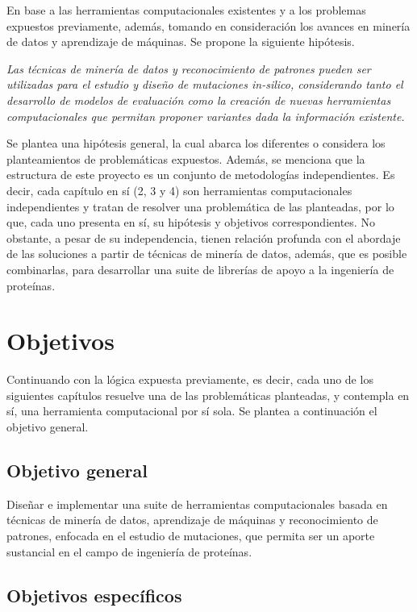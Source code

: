 En base a las herramientas computacionales existentes y a los problemas expuestos previamente, además, tomando en consideración los avances en minería de datos y aprendizaje de máquinas. Se propone la siguiente hipótesis.

\begin{center}
	\textit{Las técnicas de minería de datos y reconocimiento de patrones pueden ser utilizadas para el estudio y diseño de mutaciones in-silico, considerando tanto el desarrollo de modelos de evaluación como la creación de nuevas herramientas computacionales que permitan proponer variantes dada la información existente.}
\end{center}

Se plantea una hipótesis general, la cual abarca los diferentes o considera los planteamientos de problemáticas expuestos. Además, se menciona que la estructura de este proyecto es un conjunto de metodologías independientes. Es decir, cada capítulo en sí (2, 3 y 4) son herramientas computacionales independientes y tratan de resolver una problemática de las planteadas, por lo que, cada uno presenta en sí, su hipótesis y objetivos correspondientes. No obstante, a pesar de su independencia, tienen relación profunda con el abordaje de las soluciones a partir de técnicas de minería de datos, además, que es posible combinarlas, para desarrollar una suite de librerías de apoyo a la ingeniería de proteínas.

\section{Objetivos}

Continuando con la lógica expuesta previamente, es decir, cada uno de los siguientes capítulos resuelve una de las problemáticas planteadas, y contempla en sí, una herramienta computacional por sí sola. Se plantea a continuación el objetivo general.

\subsection{Objetivo general}

Diseñar e implementar una suite de herramientas computacionales basada en técnicas de minería de datos, aprendizaje de máquinas y reconocimiento de patrones, enfocada en el estudio de mutaciones, que permita ser un aporte sustancial en el campo de ingeniería de proteínas.

\subsection{Objetivos específicos}

